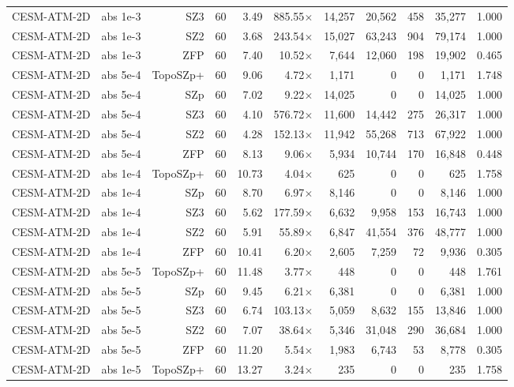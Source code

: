 \begin{tabular}{lrrrrrrrrrr}
CESM-ATM-2D & abs 1e-3 & SZ3 & 60 & 3.49 & 885.55$\times$ & 14,257 & 20,562 & 458 & 35,277 & 1.000 \\
CESM-ATM-2D & abs 1e-3 & SZ2 & 60 & 3.68 & 243.54$\times$ & 15,027 & 63,243 & 904 & 79,174 & 1.000 \\
CESM-ATM-2D & abs 1e-3 & ZFP & 60 & 7.40 & 10.52$\times$ & 7,644 & 12,060 & 198 & 19,902 & 0.465 \\
CESM-ATM-2D & abs 5e-4 & TopoSZp+ & 60 & 9.06 & 4.72$\times$ & 1,171 & 0 & 0 & 1,171 & 1.748 \\
CESM-ATM-2D & abs 5e-4 & SZp & 60 & 7.02 & 9.22$\times$ & 14,025 & 0 & 0 & 14,025 & 1.000 \\
CESM-ATM-2D & abs 5e-4 & SZ3 & 60 & 4.10 & 576.72$\times$ & 11,600 & 14,442 & 275 & 26,317 & 1.000 \\
CESM-ATM-2D & abs 5e-4 & SZ2 & 60 & 4.28 & 152.13$\times$ & 11,942 & 55,268 & 713 & 67,922 & 1.000 \\
CESM-ATM-2D & abs 5e-4 & ZFP & 60 & 8.13 & 9.06$\times$ & 5,934 & 10,744 & 170 & 16,848 & 0.448 \\
CESM-ATM-2D & abs 1e-4 & TopoSZp+ & 60 & 10.73 & 4.04$\times$ & 625 & 0 & 0 & 625 & 1.758 \\
CESM-ATM-2D & abs 1e-4 & SZp & 60 & 8.70 & 6.97$\times$ & 8,146 & 0 & 0 & 8,146 & 1.000 \\
CESM-ATM-2D & abs 1e-4 & SZ3 & 60 & 5.62 & 177.59$\times$ & 6,632 & 9,958 & 153 & 16,743 & 1.000 \\
CESM-ATM-2D & abs 1e-4 & SZ2 & 60 & 5.91 & 55.89$\times$ & 6,847 & 41,554 & 376 & 48,777 & 1.000 \\
CESM-ATM-2D & abs 1e-4 & ZFP & 60 & 10.41 & 6.20$\times$ & 2,605 & 7,259 & 72 & 9,936 & 0.305 \\
CESM-ATM-2D & abs 5e-5 & TopoSZp+ & 60 & 11.48 & 3.77$\times$ & 448 & 0 & 0 & 448 & 1.761 \\
CESM-ATM-2D & abs 5e-5 & SZp & 60 & 9.45 & 6.21$\times$ & 6,381 & 0 & 0 & 6,381 & 1.000 \\
CESM-ATM-2D & abs 5e-5 & SZ3 & 60 & 6.74 & 103.13$\times$ & 5,059 & 8,632 & 155 & 13,846 & 1.000 \\
CESM-ATM-2D & abs 5e-5 & SZ2 & 60 & 7.07 & 38.64$\times$ & 5,346 & 31,048 & 290 & 36,684 & 1.000 \\
CESM-ATM-2D & abs 5e-5 & ZFP & 60 & 11.20 & 5.54$\times$ & 1,983 & 6,743 & 53 & 8,778 & 0.305 \\
CESM-ATM-2D & abs 1e-5 & TopoSZp+ & 60 & 13.27 & 3.24$\times$ & 235 & 0 & 0 & 235 & 1.758 \\

\end{tabular}
